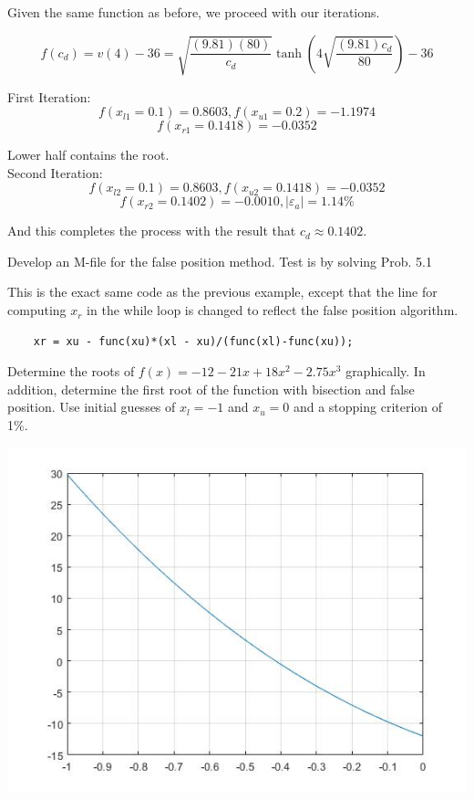 \documentclass{article}
\begin{document}
Given the same function as before, we proceed with our iterations.

\[ f(c_{d}) = v(4) - 36 = \sqrt{\frac{(9.81)(80)}{c_{d}}} \tanh\left( 4 \sqrt{\frac{(9.81)c_{d}}{80}} \right) - 36 \]

First Iteration:
\[ f(x_{l1}=0.1) = 0.8603, f(x_{u1}=0.2) = -1.1974 \]
\[ f(x_{r1}=0.1418) = -0.0352 \]

Lower half contains the root.\\

Second Iteration:
\[ f(x_{l2}=0.1) = 0.8603, f(x_{u2}=0.1418) = -0.0352 \]
\[ f(x_{r2}=0.1402) = -0.0010, \left| \varepsilon_{a} \right| = 1.14\% \]

And this completes the process with the result that $\boxed{c_{d}\approx 0.1402}$.

\begin{problem}

	Develop an M-file for the false position method. Test is by solving Prob. 5.1
	
\end{problem}

This is the exact same code as the previous example, except that the line for computing $x_{r}$ in the while loop is changed to reflect the false position algorithm.

\begin{lstlisting}
    xr = xu - func(xu)*(xl - xu)/(func(xl)-func(xu));
\end{lstlisting}

\setcounter{problem}{6}
\begin{problem}

	Determine the roots of $f(x)=-12-21x+18x^{2}-2.75x^{3}$ graphically. In addition, determine the first root of the function with bisection and false position. Use initial guesses of $x_{l}=-1$ and $x_{u}=0$ and a stopping criterion of 1\%.
	
\end{problem}

\includegraphics[width=\linewidth]{HW4-PolynomialGraph.jpg}
\end{document}
